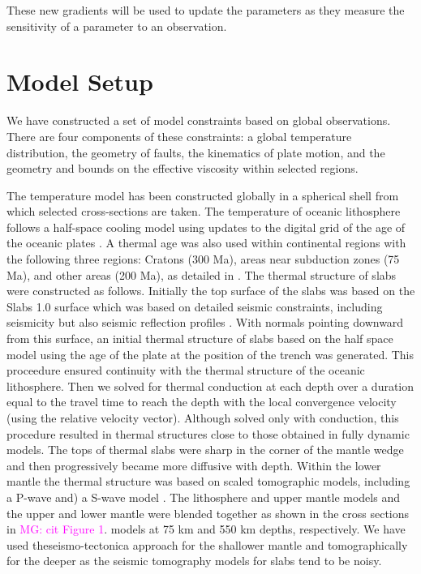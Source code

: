 \documentclass[12pt]{article}
\newcommand{\mgnote}[1]{\textcolor{magenta}{MG: #1}}
\begin{document}
These new gradients will be used to update the parameters as they measure the sensitivity of a parameter to an observation.

\section{Model Setup}
We have constructed a set of model constraints based on global observations. There are four components of these constraints: a global temperature distribution, the geometry of faults, the kinematics of plate motion, and the geometry and bounds on the effective viscosity within selected regions.

The temperature model has been constructed globally in a spherical shell from which  selected cross-sections are taken. The temperature of oceanic lithosphere follows a half-space cooling model using  updates to the digital grid of the age of the oceanic plates \citep{muller1997digital}.  
A thermal age was also used within continental regions with the following three regions: Cratons (300 Ma), areas near subduction zones (75 Ma), and other areas (200 Ma), as detailed in \citep{Stadler27082010}.
The thermal structure of slabs were constructed as follows. 
Initially the top surface of the slabs was based on the Slabs 1.0 surface which was based on detailed seismic constraints, including seismicity but also seismic reflection profiles \citep{Hayes2012}.
With normals pointing downward from this surface, an initial thermal structure of slabs based on the half space model using the age of the plate at the position of the trench was generated. This proceedure ensured continuity with the thermal structure of the oceanic lithosphere. Then we solved for thermal conduction at each depth over a duration equal to the travel time to reach the depth with the local convergence velocity (using the relative velocity vector). Although solved only with conduction, this procedure resulted in thermal structures close to those obtained in fully dynamic models. The tops of thermal  slabs were sharp in the corner of the mantle wedge and then progressively became more diffusive with depth.
Within the lower mantle the thermal structure was based on scaled tomographic models,
including a P-wave\citep{simmons2012llnl} and) a S-wave model \citep{ritsema1999complex}.
The lithosphere and upper mantle models and the upper and lower mantle were blended together as shown in the cross sections in \mgnote{cit Figure 1}.
models at 75 km and 550 km depths, respectively. We have used theseismo-tectonica approach for the shallower mantle and tomographically for the deeper as the seismic tomography models for slabs tend to be noisy.
\end{document}
